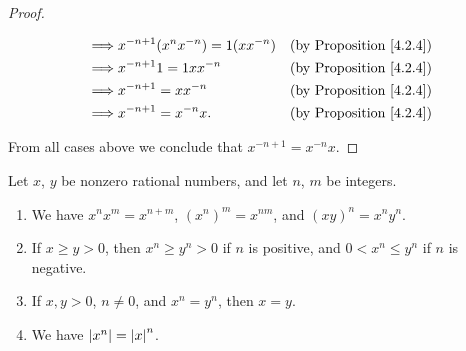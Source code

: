 \begin{proof}
\begin{enumerate}[label=(\Roman*)]
\begin{align*}
                  \implies & x^{-n + 1} (x^n x^{-n}) = 1(x x^{-n}) & \text{(by Proposition \ref{4.2.4})} \\
                  \implies & x^{-n + 1} 1 = 1x x^{-n}              & \text{(by Proposition \ref{4.2.4})} \\
                  \implies & x^{-n + 1} = x x^{-n}                 & \text{(by Proposition \ref{4.2.4})} \\
                  \implies & x^{-n + 1} = x^{-n} x.                & \text{(by Proposition \ref{4.2.4})}
              \end{align*}
    \end{enumerate}
    From all cases above we conclude that \(x^{-n + 1} = x^{-n} x\).
\end{proof}

\begin{proposition}\label{4.3.12}
    Let \(x\), \(y\) be nonzero rational numbers, and let \(n\), \(m\) be integers.
    \begin{enumerate}
        \item We have \(x^n x^m = x^{n + m}\), \((x^n)^m = x^{nm}\), and \((xy)^n = x^n y^n\).
        \item If \(x \geq y > 0\), then \(x^n \geq y^n > 0\) if \(n\) is positive, and \(0 < x^n \leq y^n\) if \(n\) is negative.
        \item If \(x, y > 0\), \(n \neq 0\), and \(x^n = y^n\), then \(x = y\).
        \item We have \(\abs*{x^n} = \abs*{x}^n\).
    \end{enumerate}
\end{proposition}

